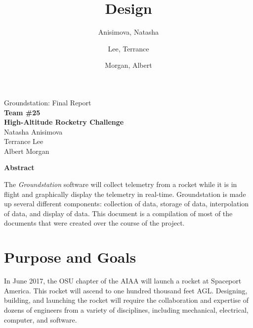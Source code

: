 \documentclass[10pt,draftclsnofoot,onecolumn]{IEEEtran}
\begin{document}
	\singlespace
	
	\title{\vspace{2in}Design}
	
	\author {
		Anisimova, Natasha
		\and
		Lee, Terrance
		\and
		Morgan, Albert
	}
	
	
	\pagestyle{empty}
	\vspace*{2in}
	\begin{center}
		\huge
		Groundstation: Final Report\\
		\normalsize
		\vspace{5mm}
		\textbf{
			Team \#25\\
			High-Altitude Rocketry Challenge\\
		}
		\vspace{1mm}
		Natasha Anisimova\\
		Terrance Lee\\
		Albert Morgan
	\end{center}
	
	\vspace{5mm}
	
	\begin{center}
		\textbf{Abstract}
	\end{center}
	
	
	The \textit{Groundstation} software will collect telemetry from a rocket while it is in flight and graphically display the telemetry in real-time. Groundstation is made up several different components: collection of data, storage of data, interpolation of data, and 
	display of data.
	This document is a compilation of most of the documents that were created over the course of the project.
		
	\pagestyle{headings}
	
	\newpage

	\tableofcontents
	\newpage

\section{Purpose and Goals}
	In June 2017, the \ac{OSU} chapter of the
	\ac{AIAA} will launch a rocket at Spaceport America.
	This rocket will ascend to one hundred thousand feet \ac{AGL}.
	Designing, building, and launching the rocket will require the
	collaboration and expertise of dozens of engineers from a variety
	of disciplines, including mechanical, electrical, computer, and
	software.
	
\end{document}
